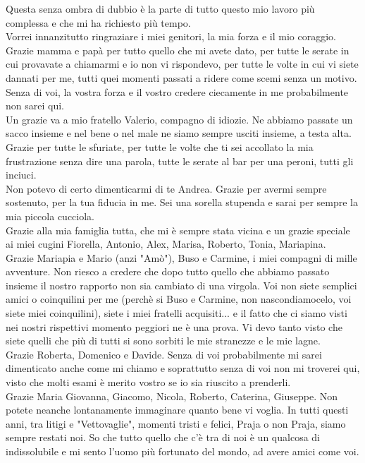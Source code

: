 Questa senza ombra di dubbio è la parte di tutto questo mio lavoro più complessa e che mi ha richiesto più tempo.\\

Vorrei innanzitutto ringraziare i miei genitori, la mia forza e il mio coraggio. Grazie mamma e papà per tutto quello che mi avete dato, per tutte le serate in cui provavate a chiamarmi e io non vi rispondevo, per tutte le volte in cui vi siete dannati per me, tutti quei momenti passati a ridere come scemi senza un motivo. Senza di voi, la vostra forza e il vostro credere ciecamente in me probabilmente non sarei qui. \\

Un grazie va a mio fratello Valerio, compagno di idiozie. Ne abbiamo passate un sacco insieme e nel bene o nel male ne siamo sempre usciti insieme, a testa alta. Grazie per tutte le sfuriate, per tutte le volte che ti sei accollato la mia frustrazione senza dire una parola, tutte le serate al bar per una peroni, tutti gli inciuci. \\

Non potevo di certo dimenticarmi di te Andrea. Grazie per avermi sempre sostenuto, per la tua fiducia in me. Sei una sorella stupenda e sarai per sempre la mia piccola cucciola. \\

Grazie alla mia famiglia tutta, che mi è sempre stata vicina e un grazie speciale ai miei cugini Fiorella, Antonio, Alex, Marisa, Roberto, Tonia, Mariapina. \\

Grazie Mariapia e Mario (anzi "Amò"), Buso e Carmine, i miei compagni di mille avventure. Non riesco a credere che dopo tutto quello che abbiamo passato insieme il nostro rapporto non sia cambiato di una virgola. Voi non siete semplici amici o coinquilini per me (perchè si Buso e Carmine, non nascondiamocelo, voi siete miei coinquilini), siete i miei fratelli acquisiti... e il fatto che ci siamo visti nei nostri rispettivi momento peggiori ne è una prova. Vi devo tanto visto che siete quelli che più di tutti si sono sorbiti le mie stranezze e le mie lagne. \\

Grazie Roberta, Domenico e Davide. Senza di voi probabilmente mi sarei dimenticato anche come mi chiamo e soprattutto senza di voi non mi troverei qui, visto che molti esami è merito vostro se io sia riuscito a prenderli. \\

Grazie Maria Giovanna, Giacomo, Nicola, Roberto, Caterina, Giuseppe. Non potete neanche lontanamente immaginare quanto bene vi voglia. In tutti questi anni, tra litigi e "Vettovaglie", momenti tristi e felici, Praja o non Praja, siamo sempre restati noi. So che tutto quello che c'è tra di noi è un qualcosa di indissolubile e mi sento l'uomo più fortunato del mondo, ad avere amici come voi.\\

